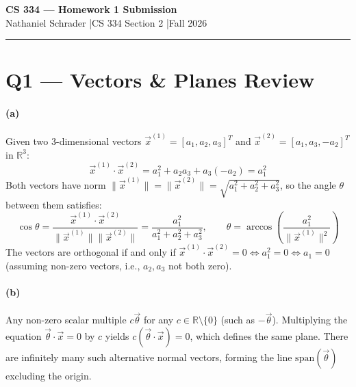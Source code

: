\documentclass[11pt]{article}
\newcommand{\R}{\mathbb{R}}
\begin{document}
\thispagestyle{hw}

\begin{center}
{\Large\bfseries CS 334 --- Homework 1 Submission}\\[4pt]
{\large Nathaniel Schrader \quad|\quad CS 334 Section 2 \quad|\quad Fall 2026}\\[10pt]
\end{center}
\vspace{6pt}
\hrule
\vspace{10pt}

\section*{Q1 --- Vectors \& Planes Review}

\paragraph{(a)} Given two 3-dimensional vectors $\vec{x}^{(1)}=[a_1,a_2,a_3]^T$ and $\vec{x}^{(2)}=[a_1,a_3,-a_2]^T$ in $\R^3$:
\[ \vec{x}^{(1)}\cdot\vec{x}^{(2)} = a_1^2 + a_2a_3 + a_3(-a_2) = a_1^2 \]
Both vectors have norm $\|\vec{x}^{(1)}\|=\|\vec{x}^{(2)}\|=\sqrt{a_1^2+a_2^2+a_3^2}$, so the angle $\theta$ between them satisfies:
\[ \cos\theta = \frac{\vec{x}^{(1)}\cdot\vec{x}^{(2)}}{\|\vec{x}^{(1)}\|\|\vec{x}^{(2)}\|} = \frac{a_1^2}{a_1^2+a_2^2+a_3^2}, \qquad \theta = \arccos\!\left(\frac{a_1^2}{\|\vec{x}^{(1)}\|^2}\right) \]
The vectors are orthogonal if and only if $\vec{x}^{(1)}\cdot\vec{x}^{(2)} = 0 \iff a_1^2=0 \iff \boxed{a_1=0}$ (assuming non-zero vectors, i.e., $a_2,a_3$ not both zero).

\paragraph{(b)} Any non-zero scalar multiple $c\vec{\theta}$ for any $c\in\R\setminus\{0\}$ (such as $-\vec{\theta}$). Multiplying the equation $\vec{\theta}\cdot\vec{x}=0$ by $c$ yields $c(\vec{\theta}\cdot\vec{x})=0$, which defines the same plane.
There are infinitely many such alternative normal vectors, forming the line $\mathrm{span}(\vec{\theta})$ excluding the origin.
\end{document}

